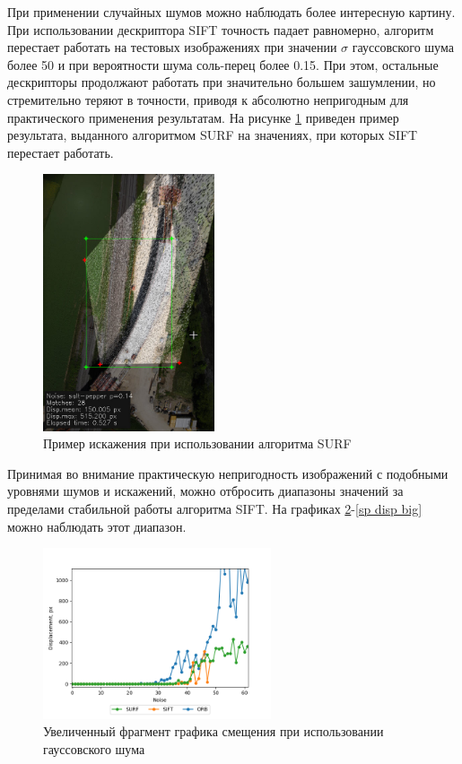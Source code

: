 {	При применении случайных шумов можно наблюдать более интересную картину. При использовании дескриптора SIFT точность падает равномерно, алгоритм перестает работать на тестовых изображениях при значении $\sigma$ гауссовского шума более 50 и при вероятности шума соль-перец более 0.15. При этом, остальные дескрипторы продолжают работать при значительно большем зашумлении, но стремительно теряют в точности, приводя к абсолютно непригодным для практического применения результатам. На рисунке \ref{fail surf} приведен пример результата, выданного алгоритмом SURF на значениях, при которых SIFT перестает работать. 
	
	\begin{figure}[H]
		\centering                             
		\includegraphics[width=0.45\textwidth,keepaspectratio]{fails/result.jpg}      
		\centering\caption{Пример искажения при использовании алгоритма SURF}
		\label{fail surf}    
	\end{figure} 

	Принимая во внимание практическую непригодность изображений с подобными уровнями шумов и искажений, можно отбросить диапазоны значений за пределами стабильной работы алгоритма SIFT. На графиках \ref{gauss disp big}-\ref{sp disp big} можно наблюдать этот диапазон. 
	
	\begin{figure}[H]
		\centering                             
		\includegraphics[width=0.60\textwidth,keepaspectratio]{ex2/gauss/Rand_noises_displacement_big.png}   
		\centering\caption{ Увеличенный фрагмент графика смещения при использовании гауссовского шума }
		\label{gauss disp big}                           
	\end{figure}    

}
